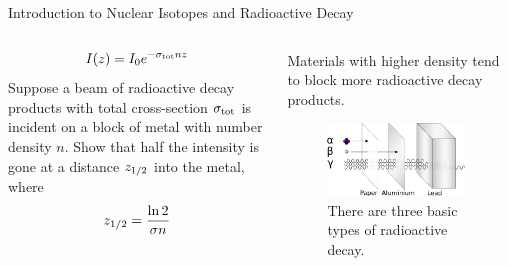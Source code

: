 \documentclass{beamer}
\begin{document}
\begin{frame}{Introduction to Nuclear Isotopes and Radioactive Decay}
\begin{columns}[T]
\begin{column}{0.6\textwidth}
\begin{equation}
I(z) = I_0 e^{-\sigma_{\rm tot} n z}
\end{equation}
Suppose a beam of radioactive decay products with total cross-section $\sigma_{\rm tot}$ is incident on a block of metal with number density $n$.  Show that half the intensity is gone at a distance $z_{\rm 1/2}$ into the metal, where
\begin{equation}
z_{\rm 1/2} = \frac{\ln 2}{\sigma n}
\end{equation}
\end{column}
\begin{column}{0.4\textwidth}
\footnotesize
Materials with higher density tend to block more radioactive decay products.
\begin{figure}
\centering
\includegraphics[width=0.95\textwidth]{figures/radioactivity.png}
\caption{\label{fig:radio4} There are three basic types of radioactive decay.}
\end{figure}
\end{column}
\end{columns}
\end{frame}
\end{document}
